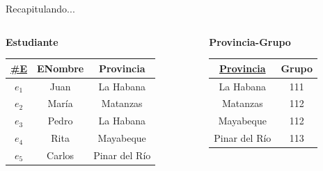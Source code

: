 \begin{frame}{Recapitulando...}
    \vspace{-3mm}
    \begin{columns}[T]
        \begin{column}{0.68\linewidth}
            \begin{columns}[T]
                \begin{column}{0.6\textwidth}
                    \begin{center}
                        \textbf{Estudiante}\\[2mm]
        
                        \begin{tabular}{ccc}
                            \underline{\#E} & ENombre & Provincia\\[1mm]
                            \hline
                            $e_1$ & Juan & La Habana\\
                            $e_2$ & Mar\'ia & Matanzas\\
                            $e_3$ & Pedro & La Habana\\
                            $e_4$ & Rita & Mayabeque\\
                            $e_5$ & Carlos & Pinar del R\'io
                        \end{tabular}
                    \end{center}
                \end{column}

                \begin{column}{0.4\textwidth}
                    \begin{center}
                        \textbf{Provincia-Grupo}\\[2mm]
        
                        \begin{tabular}{cc}
                            \underline{Provincia} & Grupo\\[1mm]
                            \hline
                            La Habana & 111\\
                            Matanzas & 112 \\
                            Mayabeque & 112 \\
                            Pinar del R\'io & 113
                            
                        \end{tabular}
                    \end{center}
                \end{column}
                

\end{columns}
\end{column}
\end{columns}
\end{frame}
